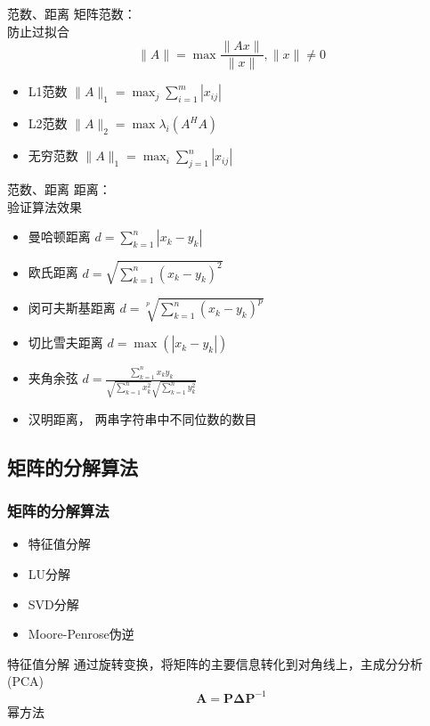\documentclass{ctexbeamer}
\begin{document}
\begin{frame}{范数、距离}
矩阵范数：\\
防止过拟合
    \begin{equation*}
        \|A\| = \max\frac{\|Ax\|}{\|x\|}, \|x\|\neq 0
    \end{equation*}
    \begin{itemize}
        \item L1范数 $\|A\|_1=\max_j\sum_{i=1}^m|x_{ij}|$
        \item L2范数 $\|A\|_2=\max \lambda_i(A^HA)$
        \item 无穷范数 $\|A\|_1=\max_i\sum_{j=1}^n|x_{ij}|$
    \end{itemize}
\end{frame}

\begin{frame}{范数、距离}
距离：\\
验证算法效果
    \begin{itemize}
        \item 曼哈顿距离 $d=\sum_{k=1}^n|x_k-y_k|$
        \item 欧氏距离 $d=\sqrt{\sum_{k=1}^n(x_k-y_k)^2}$
        \item 闵可夫斯基距离 $d=\sqrt[p]{\sum_{k=1}^n(x_k-y_k)^p}$
        \item 切比雪夫距离 $d=\max(|x_k-y_k|)$
        \item 夹角余弦 $d=\frac{\sum_{k=1}^nx_ky_k}{\sqrt{\sum_{k=1}^nx_k^2}\sqrt{\sum_{k=1}^ny_k^2}}$
        \item 汉明距离， 两串字符串中不同位数的数目
    \end{itemize}
\end{frame}

\subsection{矩阵的分解算法}
\begin{frame}
  \frametitle{矩阵的分解算法}
  \begin{itemize}
    \item 特征值分解
    \item LU分解
    \item SVD分解
    \item Moore-Penrose伪逆
  \end{itemize}

\end{frame}

\begin{frame}{特征值分解}
    通过旋转变换，将矩阵的主要信息转化到对角线上，主成分分析(PCA)
    \begin{equation*}
        \boldsymbol{A} = \boldsymbol{P}\boldsymbol{\Delta}\boldsymbol{P}^{-1}
    \end{equation*}
    幂方法
\end{frame}
\end{document}
